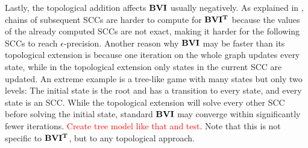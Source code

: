 Lastly, the topological addition affects $\mathbf{BVI}$ usually negatively. As explained in \cite{gandalf}, 
chains of subsequent SCCs are harder to compute for $\mathbf{BVI^T}$ because the values of the already computed SCCs are not exact, 
making it harder for the following SCCs to reach $\epsilon$-precision.
Another reason why $\mathbf{BVI}$ may be faster than its topological extension is because one iteration on the whole graph updates every state, 
while in the topological extension only states in the current SCC are updated.
An extreme example is a tree-like game with many states but only two levels: 
The initial state is the root and has a transition to every state, and every state is an SCC.
While the topological extension will solve every other SCC before solving the initial state, standard $\mathbf{BVI}$ may converge within significantly fewer iterations.
\textcolor{red}{Create tree model like that and test}.
Note that this is not specific to $\mathbf{BVI^T}$, but to any topological approach.

